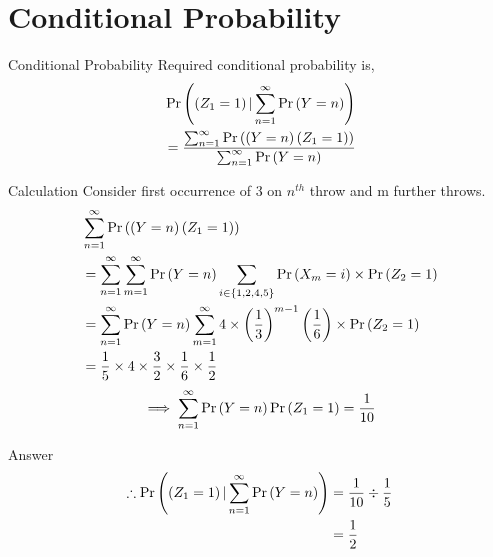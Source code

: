 \documentclass{beamer}
\begin{document}
\section{Conditional Probability}
\begin{frame}{Conditional Probability}
    Required conditional probability is,
    \begin{align}
        &\Pr\left(\left(Z_1=1\right) | \sum_{n=1}^\infty \Pr\left(Y=n\right)\right) \\
        &=\frac{\sum_{n=1}^\infty \Pr\left(\left(Y=n\right)\left(Z_1 = 1\right)\right)  } {\sum_{n=1}^\infty \Pr\left(Y=n\right)}
    \end{align}
\end{frame}
\begin{frame}{Calculation}
    Consider first occurrence of 3 on $n^{th}$ throw and m further throws.
    \begin{align}
        &\sum_{n=1}^\infty \Pr\left(\left(Y=n\right)\left(Z_1 = 1\right)\right)  \\
        &=\sum_{n=1}^\infty \sum_{m=1}^\infty \Pr\left(Y=n\right) 
          \sum_{i \in \left\{1,2,4,5\right\}}\Pr\left(X_m = i\right) \times \Pr\left(Z_2 = 1\right) \\
        &=\sum_{n=1}^\infty \Pr\left(Y=n\right) \sum_{m=1}^\infty 
        4 \times \left(\frac{1}{3}\right)^{m-1} \left(\frac{1}{6}\right) \times \Pr\left(Z_2 = 1\right) \\
        &= \frac{1}{5} \times 4 \times \frac{3}{2} \times \frac{1}{6} \times \frac{1}{2}
    \end{align}
    \begin{align}
        \implies \sum_{n=1}^\infty \Pr\left(Y=n\right) \Pr\left(Z_1 = 1\right) = \frac{1}{10}
    \end{align}
\end{frame}
\begin{frame}{Answer}
    \begin{align}
    \therefore \Pr\left(\left(Z_1=1\right) | \sum_{n=1}^\infty \Pr\left(Y=n\right)\right)  &= \frac{1}{10} \div \frac{1}{5} \\
    &= \frac{1}{2}
    \end{align}
\end{frame}
\end{document}
